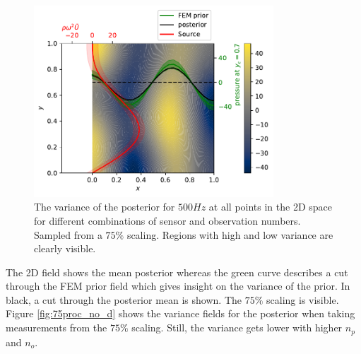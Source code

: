 \documentclass[%
  a4paper,oneside,%
  11pt,%
  smallchapters,
  style=printdev,
  extramargin,
  green,%
  rgb, <cmyk>
  ]{tubsbook}
\begin{document}
\begin{figure}[!ht]
\includegraphics[width=0.8\textwidth]{../../Python/Results/2D/75procent_no_d/SolutionCustomPosterior.pdf}
\centering
\caption{The variance of the posterior for $500Hz$ at all points in the 2D space for different combinations of sensor and observation numbers. Sampled from a $75\%$ scaling. Regions with high and low variance are clearly visible.}
\end{figure}
\label{fig:75proc_no_d_overview}

The 2D field shows the mean posterior whereas the green curve describes a cut through the FEM prior field which gives insight on the variance of the prior. In black, a cut through the posterior mean is shown. The $75\%$ scaling is visible.
%
Figure \ref{fig:75proc_no_d} shows the variance fields for the posterior when taking measurements from the $75\%$ scaling. Still, the variance gets lower with higher $n_p$ and $n_o$.
\end{document}

